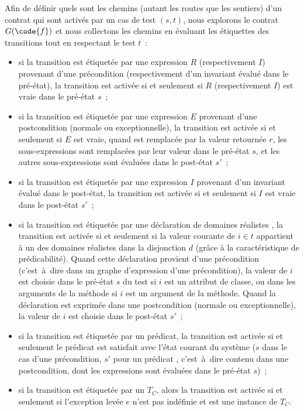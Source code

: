 Afin de définir quels sont les chemins (autant les routes que les sentiers) d'un
contrat qui sont activés par un cas de test $(s, t)$, nous explorons le contrat
$G(\code{f})$ et nous collectons les chemins en évaluant les étiquettes des
transitions tout en respectant le test $t$~:
%
\begin{itemize}

\item si la transition est étiquetée par une expression $R$ (respectivement
$I$) provenant d'une précondition (respectivement d'un invariant évalué dans le
pré-état), la transition est activée si et seulement si $R$ (respectivement $I$)
est vraie dans le pré-état $s$~;

\item si la transition est étiquetée par une expression $E$ provenant d'une
postcondition (normale ou exceptionnelle), la transition est activée si et
seulement si $E$ est vraie, quand \aresult est remplacée par la valeur retournée
$r$, les sous-expressions \aold{\empty} sont remplacées par leur valeur dans le
pré-état $s$, et les autres sous-expressions sont évaluées dans le post-état
$s'$~;

\item si la transition est étiquetée par une expression $I$ provenant d'un
invariant évalué dans le post-état, la transition est activée si et seulement si
$I$ est vraie dans le post-état $s'$~;

\item si la transition est étiquetée par une déclaration de domaines réalistes
, la transition est activée si et seulement si la valeur courante
de $i \in t$ appartient à un des domaines réalistes dans la disjonction $d$
(grâce à la caractéristique de prédicabilité). Quand cette déclaration provient
d'une précondition (c'est~à~dire dans un graphe d'expression d'une
précondition), la valeur de $i$ est choisie dans le pré-état $s$ du test si $i$
est un attribut de classe, ou dans les arguments de la méthode si $i$ est un
argument de la méthode. Quand la déclaration est exprimée dans une postcondition
(normale ou exceptionnelle), la valeur de $i$ est choisie dans le post-état
$s'$~;

\item si la transition est étiquetée par un prédicat, la transition est activée
si et seulement le prédicat est satisfait avec l'état courant du système ($s$
dans le cas d'une précondition, $s'$ pour un prédicat ,
c'est~à~dire contenu dans une postcondition, dont les expressions \aold{\empty}
sont évaluées dans le pré-état $s$)~;

\item si la transition est étiquetée par un  $T_C$,
alors la transition est activée si et seulement si l'exception levée $e$ n'est
pas indéfinie et est une instance de $T_C$.

\end{itemize}

